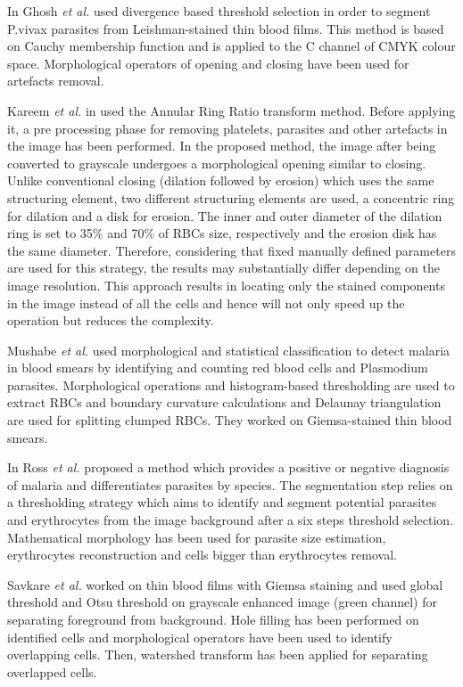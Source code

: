 \documentclass[sensors,review,submit,moreauthors,pdftex,10pt,a4paper]{mdpi}
\begin{document}
	In \cite{Ghosh2011} Ghosh \emph{et al.} used divergence based threshold selection in order to segment P.vivax parasites from Leishman-stained thin blood films. This method is based on Cauchy membership function \cite{DiRuberto2014} and is applied to the C channel of CMYK colour space. Morphological operators of opening and closing have been used for artefacts removal.
	
	Kareem \emph{et al.} in \cite{Kareem2011} used the Annular Ring Ratio transform method. Before applying it, a pre processing phase for removing platelets, parasites and other artefacts in the image has been performed. In the proposed method, the image after being converted to grayscale undergoes a morphological opening similar to closing. Unlike conventional closing (dilation followed by erosion) which uses the same structuring element, two different structuring elements are used, a concentric ring for dilation and a disk for erosion. The inner and outer diameter of the dilation ring is set to 35\% and 70\% of RBCs size, respectively and the erosion disk has the same diameter. Therefore, considering that fixed manually defined parameters are used for this strategy, the results may substantially differ depending on the image resolution. This approach results in locating only the stained components in the image instead of all the cells and hence will not only speed up the operation but reduces the complexity.
	
	Mushabe \emph{et al.} \cite{Mushabe2013} used morphological and statistical classification to detect malaria in blood smears by identifying and counting red blood cells and Plasmodium parasites. Morphological operations and histogram-based thresholding are used to extract RBCs and boundary curvature calculations and Delaunay triangulation are used for splitting clumped RBCs. They worked on Giemsa-stained thin blood smears.
	
	In \cite{Ross2006} Ross \emph{et al.} proposed a method which provides a positive or negative diagnosis of malaria and differentiates parasites by species. The segmentation step relies on a thresholding strategy which aims to identify and segment potential parasites and erythrocytes from the image background after a six steps threshold selection. Mathematical morphology has been used for parasite size estimation, erythrocytes reconstruction and cells bigger than erythrocytes removal.
	
	Savkare \emph{et al.} \cite{Savkare2011b} worked on thin blood films with Giemsa staining and used global threshold and Otsu threshold \cite{Otsu1975} on grayscale enhanced image (green channel) for separating foreground from background. Hole filling has been performed on identified cells and morphological operators have been used to identify overlapping cells. Then, watershed transform has been applied for separating overlapped cells.
	
\end{document}
